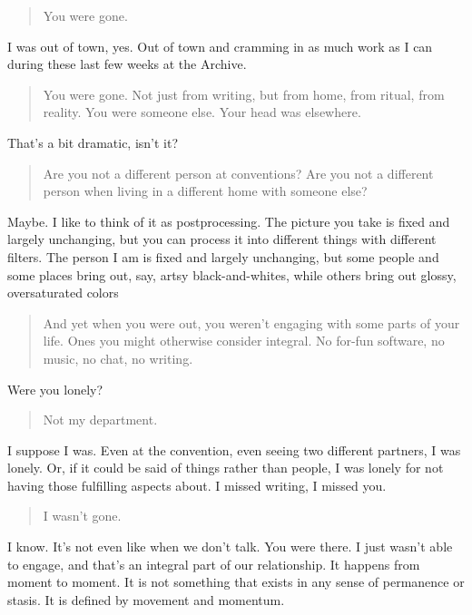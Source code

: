 \begin{quote}
You were gone.
\end{quote}

I was out of town, yes. Out of town and cramming in as much work as I can during these last few weeks at the Archive.

\begin{quote}
You were gone. Not just from writing, but from home, from ritual, from reality. You were someone else. Your head was elsewhere.
\end{quote}

That's a bit dramatic, isn't it?

\begin{quote}
Are you not a different person at conventions? Are you not a different person when living in a different home with someone else?
\end{quote}

Maybe. I like to think of it as postprocessing. The picture you take is fixed and largely unchanging, but you can process it into different things with different filters. The person I am is fixed and largely unchanging, but some people and some places bring out, say, artsy black-and-whites, while others bring out glossy, oversaturated colors

\begin{quote}
And yet when you were out, you weren't engaging with some parts of your life. Ones you might otherwise consider integral. No for-fun software, no music, no chat, no writing.
\end{quote}

Were you lonely?

\begin{quote}
Not my department.
\end{quote}

I suppose I was. Even at the convention, even seeing two different partners, I was lonely. Or, if it could be said of things rather than people, I was lonely for not having those fulfilling aspects about. I missed writing, I missed you.

\begin{quote}
I wasn't gone.
\end{quote}

I know. It's not even like when we don't talk. You were there. I just wasn't able to engage, and that's an integral part of our relationship. It happens from moment to moment. It is not something that exists in any sense of permanence or stasis. It is defined by movement and momentum.

